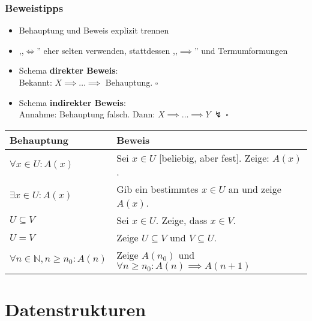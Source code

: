 \renewcommand{\arraystretch}{1.0}
\begin{frame}
  \frametitle{Beweistipps}
  \begin{itemize}
  \item Behauptung und Beweis explizit trennen
  \item ,,$\iff$'' eher selten verwenden, stattdessen ,,$\implies$'' und Termumformungen
  \item Schema \textbf{direkter Beweis}: \\
        Bekannt: $X \implies \ldots \implies$ Behauptung. $\square$
  \item Schema \textbf{indirekter Beweis}: \\
        Annahme: Behauptung falsch.
        Dann: $X \implies \ldots \implies Y \ \lightning \ \square$
  \end{itemize}

  \begin{center}
  \begin{tabular}{| l || l |} \hline
  \textbf{Behauptung} & \textbf{Beweis} \\ \hline
    $\forall x \in U: A(x)$
      & Sei $x \in U$ [beliebig, aber fest]. Zeige: $A(x)$.
      \\ \hline
    $\exists x \in U: A(x)$
      & Gib ein bestimmtes $x \in U$ an und zeige $A(x)$.
      \\ \hline
    $U \subseteq V$
      & Sei $x \in U$. Zeige, dass $x \in V$.
      \\ \hline
    $U = V$
      & Zeige $U \subseteq V$ und $V \subseteq U$.
      \\ \hline
    $\forall n \in \mathbb{N}, n \geq n_0: A(n)$
      & Zeige $A(n_0)$ und $\forall n \geq n_0: A(n) \implies A(n+1)$
      \\ \hline
  \end{tabular}
  \end{center}
\end{frame}
\renewcommand{\arraystretch}{1.5}

\section{Datenstrukturen}
